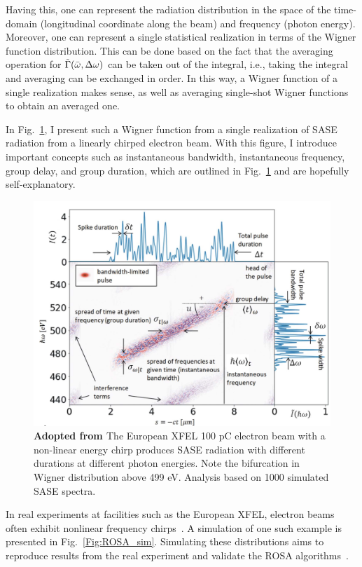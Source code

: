     Having this, one can represent the radiation distribution in the space of the time-domain (longitudinal coordinate along the beam) and frequency (photon energy). Moreover, one can represent a single statistical realization in terms of the Wigner function distribution. This can be done based on the fact that the averaging operation for $\Tilde{\Gamma}(\bar{\omega}, \Delta \omega)$ can be taken out of the integral, i.e., taking the integral and averaging can be exchanged in order. In this way, a Wigner function of a single realization makes sense, as well as averaging single-shot Wigner functions to obtain an averaged one.
    
    In Fig.~\ref{Fig:ROSA_linear_chirp}, I present such a Wigner function from a single realization of SASE radiation from a linearly chirped electron beam. With this figure, I introduce important concepts such as instantaneous bandwidth, instantaneous frequency, group delay, and group duration, which are outlined in Fig.~\ref{Fig:ROSA_linear_chirp} and are hopefully self-explanatory. 
    \begin{figure}[h!]
    	\centering
        \includegraphics[width=0.75\linewidth]{content/images/4_FEL_Theory/ROSA_linear_chirp.png}
        \captionsetup{justification=centering}
        \caption{\textbf{Adopted from \cite{serkez_wigner_2021}} The European XFEL 100 pC electron beam with a non-linear energy chirp produces SASE radiation with different durations at different photon energies. Note the bifurcation in Wigner distribution above 499 eV. Analysis based on 1000 simulated SASE spectra.}
        \label{Fig:ROSA_linear_chirp}
    \end{figure} 
    In real experiments at facilities such as the European XFEL, electron beams often exhibit nonlinear frequency chirps~. A simulation of one such example is presented in Fig.~\ref{Fig:ROSA_sim}. Simulating these distributions aims to reproduce results from the real experiment and validate the ROSA algorithms~\cite{serkez_wigner_2021}.
